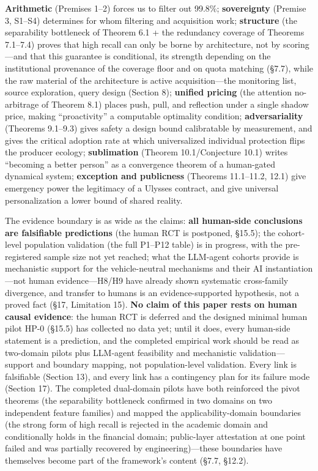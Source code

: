\documentclass[
  11pt]{article}
\begin{document}
\textbf{Arithmetic} (Premises 1--2) forces us to filter out 99.8\%;
\textbf{sovereignty} (Premise 3, S1--S4) determines for whom filtering
and acquisition work; \textbf{structure} (the separability bottleneck of
Theorem 6.1 + the redundancy coverage of Theorems 7.1--7.4) proves that
high recall can only be borne by architecture, not by scoring---and that
this guarantee is conditional, its strength depending on the
institutional provenance of the coverage floor and on quota matching
(§7.7), while the raw material of the architecture is active
acquisition---the monitoring list, source exploration, query design
(Section 8); \textbf{unified pricing} (the attention no-arbitrage of
Theorem 8.1) places push, pull, and reflection under a single shadow
price, making ``proactivity'' a computable optimality condition;
\textbf{adversariality} (Theorems 9.1--9.3) gives safety a design bound
calibratable by measurement, and gives the critical adoption rate at
which universalized individual protection flips the producer ecology;
\textbf{sublimation} (Theorem 10.1/Conjecture 10.1) writes ``becoming a
better person'' as a convergence theorem of a human-gated dynamical
system; \textbf{exception and publicness} (Theorems 11.1--11.2, 12.1)
give emergency power the legitimacy of a Ulysses contract, and give
universal personalization a lower bound of shared reality.

The evidence boundary is as wide as the claims: \textbf{all human-side
conclusions are falsifiable predictions} (the human RCT is postponed,
§15.5); the cohort-level population validation (the full P1--P12 table)
is in progress, with the pre-registered sample size not yet reached;
what the LLM-agent cohorts provide is mechanistic support for the
vehicle-neutral mechanisms and their AI instantiation---not human
evidence---H8/H9 have already shown systematic cross-family divergence,
and transfer to humans is an evidence-supported hypothesis, not a proved
fact (§17, Limitation 15). \textbf{No claim of this paper rests on human
causal evidence}: the human RCT is deferred and the designed minimal
human pilot HP-0 (§15.5) has collected no data yet; until it does, every
human-side statement is a prediction, and the completed empirical work
should be read as two-domain pilots plus LLM-agent feasibility and
mechanistic validation---support and boundary mapping, not
population-level validation. Every link is falsifiable (Section 13), and
every link has a contingency plan for its failure mode (Section 17). The
completed dual-domain pilots have both reinforced the pivot theorems
(the separability bottleneck confirmed in two domains on two independent
feature families) and mapped the applicability-domain boundaries (the
strong form of high recall is rejected in the academic domain and
conditionally holds in the financial domain; public-layer attestation at
one point failed and was partially recovered by engineering)---these
boundaries have themselves become part of the framework's content (§7.7,
§12.2).
\end{document}
